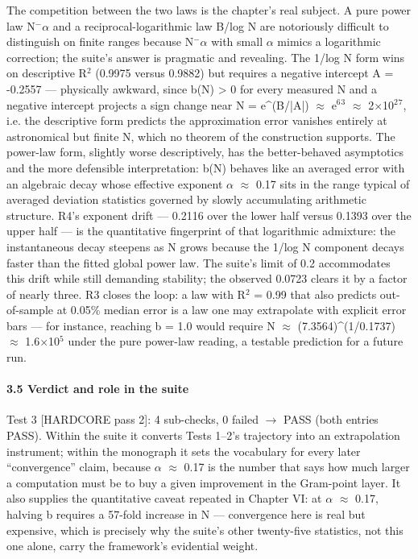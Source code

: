 \documentclass[10pt]{article}
\begin{document}
The competition between the two laws is the chapter's real subject. A pure power law N$^-$$\alpha$ and a reciprocal-logarithmic law B/log N are notoriously difficult to distinguish on finite ranges because N$^-$$\alpha$ with small $\alpha$ mimics a logarithmic correction; the suite's answer is pragmatic and revealing. The 1/log N form wins on descriptive R$^2$ (0.9975 versus 0.9882) but requires a negative intercept A = -0.2557 --- physically awkward, since b(N) > 0 for every measured N and a negative intercept projects a sign change near N = e\textasciicircum{}(B/|A|) $\approx$ e$^6$$^3$ $\approx$ 2$\times$10$^2$$^7$, i.e. the descriptive form predicts the approximation error vanishes entirely at astronomical but finite N, which no theorem of the construction supports. The power-law form, slightly worse descriptively, has the better-behaved asymptotics and the more defensible interpretation: b(N) behaves like an averaged error with an algebraic decay whose effective exponent $\alpha$ $\approx$ 0.17 sits in the range typical of averaged deviation statistics governed by slowly accumulating arithmetic structure. R4's exponent drift --- 0.2116 over the lower half versus 0.1393 over the upper half --- is the quantitative fingerprint of that logarithmic admixture: the instantaneous decay steepens as N grows because the 1/log N component decays faster than the fitted global power law. The suite's limit of 0.2 accommodates this drift while still demanding stability; the observed 0.0723 clears it by a factor of nearly three. R3 closes the loop: a law with R$^2$ = 0.99 that also predicts out-of-sample at 0.05\% median error is a law one may extrapolate with explicit error bars --- for instance, reaching b = 1.0 would require N $\approx$ (7.3564)\textasciicircum{}(1/0.1737) $\approx$ 1.6$\times$10$^5$ under the pure power-law reading, a testable prediction for a future run.

\paragraph{3.5 Verdict and role in the suite}

Test 3 [HARDCORE pass 2]: 4 sub-checks, 0 failed $\rightarrow$ PASS (both entries PASS). Within the suite it converts Tests 1--2's trajectory into an extrapolation instrument; within the monograph it sets the vocabulary for every later ``convergence'' claim, because $\alpha$ $\approx$ 0.17 is the number that says how much larger a computation must be to buy a given improvement in the Gram-point layer. It also supplies the quantitative caveat repeated in Chapter VI: at $\alpha$ $\approx$ 0.17, halving b requires a 57-fold increase in N --- convergence here is real but expensive, which is precisely why the suite's other twenty-five statistics, not this one alone, carry the framework's evidential weight.
\end{document}
